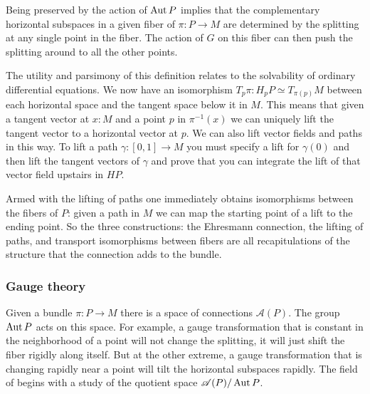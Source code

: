 Being preserved by the action of \( \operatorname{Aut} P \) implies that the complementary horizontal subspaces in a given fiber of \( \pi:P\to M \) are determined by the splitting at any single point in the fiber. The action of \( G \) on this fiber can then push the splitting around to all the other points.

The utility and parsimony of this definition relates to the solvability of ordinary differential equations. We now have an isomorphism \( T_p\pi:H_pP\simeq T_{\pi(p)}M \) between each horizontal space and the tangent space below it in \( M \). This means that given a tangent vector at \( x:M \) and a point \( p \) in \( \pi^{-1}(x) \) we can uniquely lift the tangent vector to a horizontal vector at \( p \). We can also lift vector fields and paths in this way. To lift a path \( \gamma:[0,1]\to M \) you must specify a lift for \( \gamma(0) \) and then lift the tangent vectors of \( \gamma \) and prove that you can integrate the lift of that vector field upstairs in \( HP \).

Armed with the lifting of paths one immediately obtains isomorphisms between the fibers of \( P \): given a path in \( M \) we can map the starting point of a lift to the ending point. So the three constructions: the Ehresmann connection, the lifting of paths, and transport isomorphisms between fibers are all recapitulations of the structure that the connection adds to the bundle.

\subsubsection{Gauge theory}

Given a bundle \( \pi:P\to M \) there is a space of connections \( \mathscr{A}(P) \). The group \( \operatorname{Aut} P \) acts on this space. For example, a gauge transformation that is constant in the neighborhood of a point will not change the splitting, it will just shift the fiber rigidly along itself. But at the other extreme, a gauge transformation that is changing rapidly near a point will tilt the horizontal subspaces rapidly. The field of  begins with a study of the quotient space \( \mathscr{A}(P)/\operatorname{Aut} P \).

